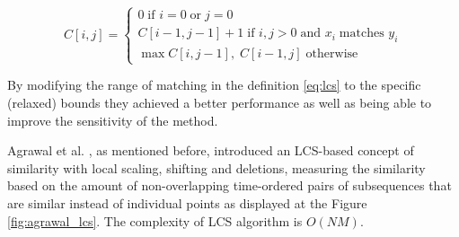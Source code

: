 \begin{equation}
 C[i,j] = 
 \begin{cases} 
  0 \; \text{if } i=0 \; \text{or} \; j=0 \\
  C[i-1,j-1]+1 \; \text{if } i,j>0 \; \text{and } x_{i} \; \text{matches } y_{i} \\
  \max{C[i,j-1], \;C[i-1,j]} \; \text{otherwise}
 \end{cases}
\label{eq:lcs}
\end{equation}

By modifying the range of matching in the definition \ref{eq:lcs} to the specific (relaxed) bounds they achieved a better performance as well as being able to improve the sensitivity of the method. 

Agrawal et al. \cite{citeulike:3816327}, as mentioned before, introduced an LCS-based concept of similarity with local scaling, shifting and deletions, measuring the similarity based on the amount of non-overlapping time-ordered pairs of subsequences that are similar instead of individual points as displayed at the Figure \ref{fig:agrawal_lcs}. The complexity of LCS algorithm is $O(NM)$.